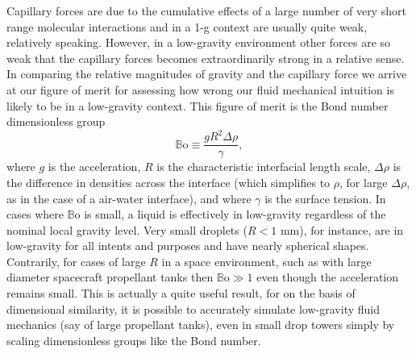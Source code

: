 \documentclass[12pt,a4paper,oneside]{book}
\begin{document}
Capillary forces are due to the cumulative effects of a large number of very short range molecular interactions and in a 1-g context are usually quite weak, relatively speaking. However, in a low-gravity environment other forces are so weak that the capillary forces becomes extraordinarily strong in a relative sense. In comparing the relative magnitudes of gravity and the capillary force we arrive at our figure of merit for assessing how wrong our fluid mechanical intuition is likely to be in a low-gravity context. This figure of merit is the Bond number dimensionless group
\[ \mathbb{B}\mbox{o} \equiv \frac{g R^2 \Delta \rho}{\gamma}, 
\]
where $g$ is the acceleration, $R$ is the characteristic interfacial length scale, $\Delta \rho$ is the difference in densities across the interface (which simplifies to $\rho$, for large $\Delta \rho$, as in the case of a air-water interface), and where $\gamma$ is the surface tension. In cases where $\mathbb{B}\mbox{o}$ is small, a liquid is effectively in low-gravity regardless of the nominal local gravity level. Very small droplets ($R < 1$ mm), for instance, are in low-gravity for all intents and purposes and have nearly spherical shapes. Contrarily, for cases of large $R$ in a space environment, such as with large diameter spacecraft propellant tanks then $ \mathbb{B}\mbox{o} \gg 1$ even though the acceleration remains small. This is actually a quite useful result, for on the basis of dimensional similarity, it is possible to accurately simulate low-gravity fluid mechanics (say of large propellant tanks), even in small drop towers simply by scaling dimensionless groups like the Bond number. 
\end{document}
